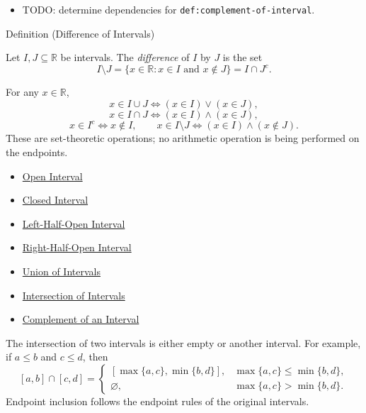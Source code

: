 \begin{dependencies}
\begin{itemize}
  \item TODO: determine dependencies for \texttt{def:complement-of-interval}.
\end{itemize}
\end{dependencies}

\begin{definitionbox}{Definition (Difference of Intervals)}
\begin{definition}
\label{def:difference-of-intervals}
Let $I,J\subseteq\mathbb{R}$ be intervals. The \emph{difference} of $I$ by
$J$ is the set
\[
I\setminus J=\{x\in\mathbb{R}:x\in I\text{ and }x\notin J\}
=I\cap J^{c}.
\]
\end{definition}
\end{definitionbox}

\begin{remark*}
For any $x\in\mathbb{R}$,
\[
x\in I\cup J \Longleftrightarrow (x\in I)\lor(x\in J),
\]
\[
x\in I\cap J \Longleftrightarrow (x\in I)\land(x\in J),
\]
\[
x\in I^c \Longleftrightarrow x\notin I,
\qquad
x\in I\setminus J \Longleftrightarrow (x\in I)\land(x\notin J).
\]
These are set-theoretic operations; no arithmetic operation is being performed
on the endpoints.
\end{remark*}

\begin{dependencies}
\begin{itemize}
  \item \hyperref[def:open-interval]{Open Interval}
  \item \hyperref[def:closed-interval]{Closed Interval}
  \item \hyperref[def:left-half-open-interval]{Left-Half-Open Interval}
  \item \hyperref[def:right-half-open-interval]{Right-Half-Open Interval}
  \item \hyperref[def:union-of-intervals]{Union of Intervals}
  \item \hyperref[def:intersection-of-intervals]{Intersection of Intervals}
  \item \hyperref[def:complement-of-interval]{Complement of an Interval}
\end{itemize}
\end{dependencies}

\begin{remark*}
The intersection of two intervals is either empty or another interval. For
example, if $a\leq b$ and $c\leq d$, then
\[
[a,b]\cap[c,d]
=
\begin{cases}
[\max\{a,c\},\min\{b,d\}], & \max\{a,c\}\leq \min\{b,d\},\\
\varnothing, & \max\{a,c\}>\min\{b,d\}.
\end{cases}
\]
Endpoint inclusion follows the endpoint rules of the original intervals.
\end{remark*}

